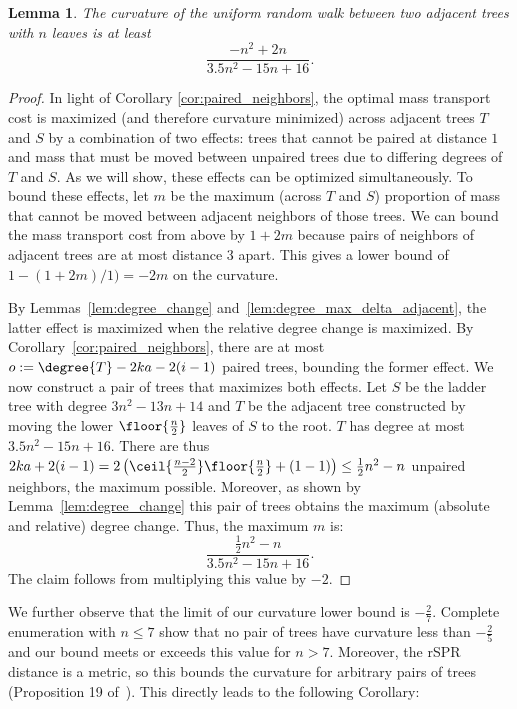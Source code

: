 \documentclass[11pt,onecolumn,conference]{IEEEtran}
\newtheorem{lemma}[theorem]{Lemma}
\begin{document}
\begin{lemma}
	The curvature of the uniform random walk between two adjacent trees with $n$ leaves is at least
	$$\frac{-n^2 + 2n}{3.5n^2 - 15n + 16}.$$
\end{lemma}
\begin{proof}
    In light of Corollary \ref{cor:paired_neighbors}, the optimal mass transport cost is maximized (and therefore curvature minimized) across adjacent trees $T$ and $S$ by a combination of two effects: trees that cannot be paired at distance $1$ and mass that must be moved between unpaired trees due to differing degrees of $T$ and $S$.
		As we will show, these effects can be optimized simultaneously.
    To bound these effects, let $m$ be the maximum (across $T$ and $S$) proportion of mass that cannot be moved between adjacent neighbors of those trees.
    We can bound the mass transport cost from above by $1 + 2m$ because pairs of neighbors of adjacent trees are at most distance 3 apart.
	This gives a lower bound of $1 - (1 + 2m) / 1) = -2m$ on the curvature.

	By Lemmas~\ref{lem:degree_change} and~\ref{lem:degree_max_delta_adjacent}, the latter effect is maximized when the relative degree change is maximized.
	By Corollary~\ref{cor:paired_neighbors}, there are at most $o := \degree{T} -2ka - 2(i-1)$ paired trees, bounding the former effect.
	We now construct a pair of trees that maximizes both effects.
	Let $S$ be the ladder tree with degree $3n^2 - 13n + 14$ and $T$ be the adjacent tree constructed by moving the lower $\floor{\frac{n}{2}}$ leaves of $S$ to the root.
	$T$ has degree at most $3.5n^2 -15n + 16$.
	There are thus $2ka + 2(i-1) = 2\left(\ceil{\frac{n-2}{2}}\floor{\frac{n}{2}} +(1-1)\right) \le \frac{1}{2}n^2 - n$ unpaired neighbors, the maximum possible.
	Moreover, as shown by Lemma~\ref{lem:degree_change} this pair of trees obtains the maximum (absolute and relative) degree change.
	Thus, the maximum $m$ is:
	$$\frac{\frac{1}{2}n^2 - n}{3.5n^2 - 15n + 16}.$$
	The claim follows from multiplying this value by $-2$.
\end{proof}

We further observe that the limit of our curvature lower bound is $-\frac{2}{7}$.
Complete enumeration with $n \le 7$ show that no pair of trees have curvature less than $-\frac{2}{5}$ and our bound meets or exceeds this value for $n > 7$.
Moreover, the rSPR distance is a metric, so this bounds the curvature for arbitrary pairs of trees (Proposition 19 of~\cite{Ollivier2009-bw}).
This directly leads to the following Corollary:
\end{document}
